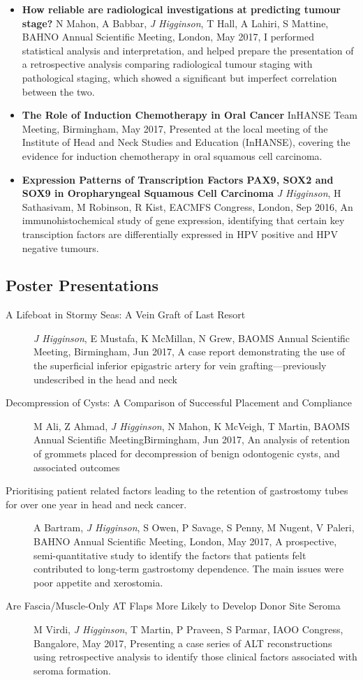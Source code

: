 \begin{itemize}
        \item\textbf{How reliable are radiological investigations at predicting tumour stage?} N Mahon, A Babbar, \emph{J Higginson}, T Hall, A Lahiri, S Mattine, BAHNO Annual Scientific Meeting, London, May 2017, I performed statistical analysis and interpretation, and helped prepare the presentation of a retrospective analysis comparing radiological tumour staging with pathological staging, which showed a significant but imperfect correlation between the two.
        \item\textbf{The Role of Induction Chemotherapy in Oral Cancer} InHANSE Team Meeting, Birmingham, May 2017, Presented at the local meeting of the Institute of Head and Neck Studies and Education (InHANSE), covering the evidence for induction chemotherapy in oral squamous cell carcinoma.
        \item\textbf{Expression Patterns of Transcription Factors PAX9, SOX2 and SOX9 in Oropharyngeal Squamous Cell Carcinoma} \emph{J Higginson}, H Sathasivam, M Robinson, R Kist, EACMFS Congress, London, Sep 2016, An immunohistochemical study of gene expression, identifying that certain key transciption factors are differentially expressed in HPV positive and HPV negative tumours.
\end{itemize}


\subsection{Poster Presentations}
\begin{description}
        \item[A Lifeboat in Stormy Seas: A Vein Graft of Last Resort]{\emph{J Higginson}, E Mustafa, K McMillan, N Grew, BAOMS Annual Scientific Meeting, Birmingham, Jun 2017, A case report demonstrating the use of the superficial inferior epigastric artery for vein grafting---previously undescribed in the head and neck}
        \item[Decompression of Cysts: A Comparison of Successful Placement and Compliance]{M Ali, Z Ahmad, \emph{J Higginson}, N Mahon, K McVeigh, T Martin, BAOMS Annual Scientific Meeting}{Birmingham, Jun 2017, An analysis of retention of grommets placed for decompression of benign odontogenic cysts, and associated outcomes}
        \item[Prioritising patient related factors leading to the retention of gastrostomy tubes for over one year in head and neck cancer.]{A Bartram, \emph{J Higginson}, S Owen, P Savage, S Penny, M Nugent, V Paleri, BAHNO Annual Scientific Meeting, London, May 2017, A prospective, semi-quantitative study to identify the factors that patients felt contributed to long-term gastrostomy dependence. The main issues were poor appetite and xerostomia.}
        \item[Are Fascia/Muscle-Only AT Flaps More Likely to Develop Donor Site Seroma]{M Virdi, \emph{J Higginson}, T Martin, P Praveen, S Parmar, IAOO Congress, Bangalore, May 2017, Presenting a case series of ALT reconstructions using retrospective analysis to identify those clinical factors associated with seroma formation.}
\end{description}
